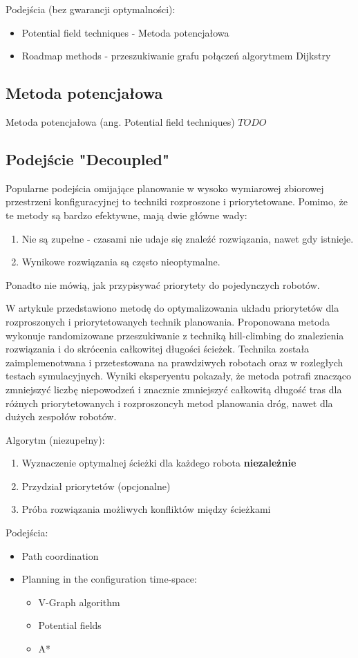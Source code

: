 Podejścia (bez gwarancji optymalności):
\begin{itemize}
	\item Potential field techniques - Metoda potencjałowa
	\item Roadmap methods - przeszukiwanie grafu połączeń algorytmem Dijkstry
\end{itemize}

\subsection{Metoda potencjałowa}
Metoda potencjałowa (ang. Potential field techniques) $TODO$

\subsection{Podejście "Decoupled"}
Popularne podejścia omijające planowanie w wysoko wymiarowej zbiorowej przestrzeni konfiguracyjnej to techniki rozproszone i priorytetowane.
Pomimo, że te metody są bardzo efektywne, mają dwie główne wady:
\begin{enumerate}
	\item Nie są zupełne - czasami nie udaje się znaleźć rozwiązania, nawet gdy istnieje.
	\item Wynikowe rozwiązania są często nieoptymalne.
\end{enumerate}

Ponadto nie mówią, jak przypisywać priorytety do pojedynczych robotów.

W artykule \cite{optpriorities} przedstawiono metodę do optymalizowania układu priorytetów dla rozproszonych i priorytetowanych technik planowania.
Proponowana metoda wykonuje randomizowane przeszukiwanie z techniką hill-climbing do znalezienia rozwiązania i do skrócenia całkowitej długości ścieżek.
Technika została zaimplemenotwana i przetestowana na prawdziwych robotach oraz w rozległych testach symulacyjnych.
Wyniki eksperyentu pokazały, że metoda potrafi znacząco zmniejszyć liczbę niepowodzeń i znacznie zmniejszyć całkowitą długość tras dla różnych priorytetowanych i rozproszoncyh metod planowania dróg, nawet dla dużych zespołów robotów.

Algorytm (niezupełny):
\begin{enumerate}
	\item Wyznaczenie optymalnej ścieżki dla każdego robota {\bf niezależnie}
	\item Przydział priorytetów (opcjonalne)
	\item Próba rozwiązania możliwych konfliktów między ścieżkami
\end{enumerate}
Podejścia:
\begin{itemize}
	\item Path coordination
	\item Planning in the configuration time-space: %
		\begin{itemize}
			\item V-Graph algorithm
			\item Potential fields
			\item A*
		\end{itemize}
\end{itemize}

